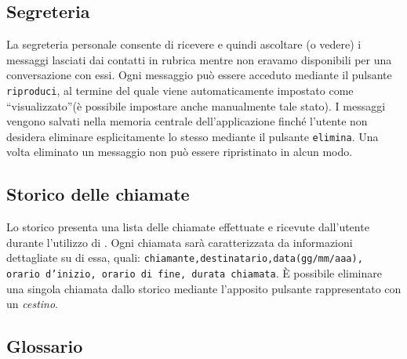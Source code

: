 \subsection{Segreteria}
La segreteria personale consente di ricevere e quindi ascoltare (o vedere) i messaggi lasciati dai contatti in rubrica mentre non eravamo disponibili per una conversazione con essi.
Ogni messaggio può essere acceduto mediante il pulsante \texttt{riproduci}, al termine del quale viene automaticamente impostato come ``visualizzato''(è possibile impostare anche manualmente tale stato).
I messaggi vengono salvati nella memoria centrale dell'applicazione \caName{} finché l'utente non desidera eliminare esplicitamente lo stesso mediante il pulsante \texttt{elimina}. Una volta eliminato un messaggio non può essere ripristinato in alcun modo.

\subsection{Storico delle chiamate}
Lo storico presenta una lista delle chiamate effettuate e ricevute dall'utente durante l'utilizzo di \caName{}. Ogni chiamata sarà caratterizzata da informazioni dettagliate su di essa, quali: \texttt{chiamante,destinatario,data(gg/mm/aaa), orario d'inizio, orario di fine, durata chiamata}.
È possibile eliminare una singola chiamata dallo storico mediante l'apposito pulsante rappresentato con un \textit{cestino}.

\subsection{Glossario}




